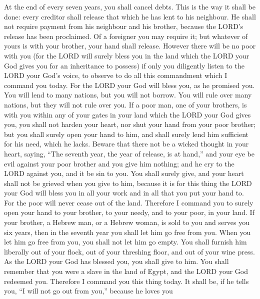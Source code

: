  At the end of every seven years, you shall cancel debts.
 This is the way it shall be done: every creditor shall
release that which he has lent to his neighbour. He shall not require
payment from his neighbour and his brother, because the LORD's release
has been proclaimed.  Of a foreigner you may require it;
but whatever of yours is with your brother, your hand shall release.
 However there will be no poor with you (for the LORD will
surely bless you in the land which the LORD your God gives you for an
inheritance to possess)  if only you diligently listen to
the LORD your God's voice, to observe to do all this commandment which I
command you today.  For the LORD your God will bless you,
as he promised you. You will lend to many nations, but you will not
borrow. You will rule over many nations, but they will not rule over
you.  If a poor man, one of your brothers, is with you
within any of your gates in your land which the LORD your God gives you,
you shall not harden your heart, nor shut your hand from your poor
brother;  but you shall surely open your hand to him, and
shall surely lend him sufficient for his need, which he lacks.
 Beware that there not be a wicked thought in your heart,
saying, ``The seventh year, the year of release, is at hand,'' and your
eye be evil against your poor brother and you give him nothing; and he
cry to the LORD against you, and it be sin to you.  You
shall surely give, and your heart shall not be grieved when you give to
him, because it is for this thing the LORD your God will bless you in
all your work and in all that you put your hand to.  For
the poor will never cease out of the land. Therefore I command you to
surely open your hand to your brother, to your needy, and to your poor,
in your land.  If your brother, a Hebrew man, or a Hebrew
woman, is sold to you and serves you six years, then in the seventh year
you shall let him go free from you.  When you let him go
free from you, you shall not let him go empty.  You shall
furnish him liberally out of your flock, out of your threshing floor,
and out of your wine press. As the LORD your God has blessed you, you
shall give to him.  You shall remember that you were a
slave in the land of Egypt, and the LORD your God redeemed you.
Therefore I command you this thing today.  It shall be,
if he tells you, ``I will not go out from you,'' because he loves you
